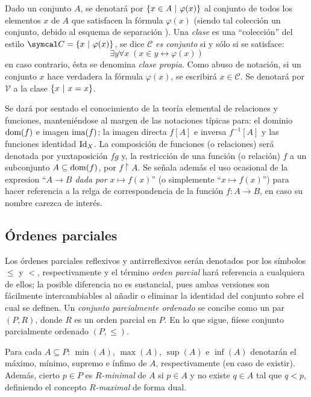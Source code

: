     Dado un conjunto $A$, se denotará por $\{x \in A \text{ $|$ } \varphi (x)\}$ al conjunto de todos los elementos $x$ de $A$ que satisfacen la fórmula $\varphi (x)$ (siendo tal colección un conjunto, debido al esquema de separación \cite[p.~xv]{kunenSet}). Una \textit{clase} es una ``colección'' del estilo $\mathcal{C} = \{x \tq \varphi (x)\}$, se dice $\mathcal{C}$ \textit{es conjunto} si y sólo si se satisface:
    $$\exists y \forall x \; ( x \in y \leftrightarrow \varphi(x)  ) $$
    en caso contrario, ésta se denomina \textit{clase propia}. Como abuso de notación, si un conjunto $x$ hace verdadera la fórmula $\varphi(x)$, se escribirá $x \in \mathcal{C}$. Se denotará por $\mathcal{V}$ a la clase $\{x \text{ $|$ } x=x\}$.

    \index[sym]{$\mapsto$}
    Se dará por sentado el conocimiento de la teoría elemental de relaciones y funciones, manteniéndose al margen de las notaciones típicas para: el dominio $\operatorname{dom}(f)$ e imagen $\operatorname{ima}(f)$; la imagen directa $f[A]$ e inversa $f^{-1}[A]$ y las funciones identidad $\operatorname{Id}_X$. La composición de funciones (o relaciones) será denotada por yuxtaposición $fg$ y, la restricción de una función (o relación) $f$ a un subconjunto $A \subseteq \operatorname{dom}(f)$, por $f \upharpoonright A$. Se señala además el uso ocasional de la expresion ``\textit{$A \to B$ dada por $x \mapsto f(x)$}'' (o simplemente ``$x \mapsto f(x)$'') para hacer referencia a la relga de correspondencia de la función $f:A \to B$, en caso su nombre carezca de interés.

    \subsection{Órdenes parciales}

    Los órdenes parciales reflexivos y antirreflexivos serán denotados por los símbolos $\leq$ y $<$, respectivamente y el término \textit{orden parcial} hará referencia a cualquiera de ellos; la posible diferencia no es sustancial, pues ambas versiones son fácilmente intercambiables al añadir o eliminar la identidad del conjunto sobre el cual se definen. Un \textit{conjunto parcialmente ordenado} se concibe como un par $(P, R)$, donde $R$ es un orden parcial en $P$. En lo que sigue, fiíese conjunto parcialmente ordenado $(P, \leq)$.

    Para cada $A \subseteq P$: $\min(A)$, $\max(A)$, $\sup(A)$ e $\inf(A)$ denotarán el máximo, mínimo, supremo e ínfimo de $A$, respectivamente (en caso de existir). Además, cierto $p \in P$ es \textit{$R$-minimal} de $A$ si $p \in A$ y no existe $q \in A$ tal que $q < p$, definiendo el concepto \textit{$R$-maximal} de forma dual.

